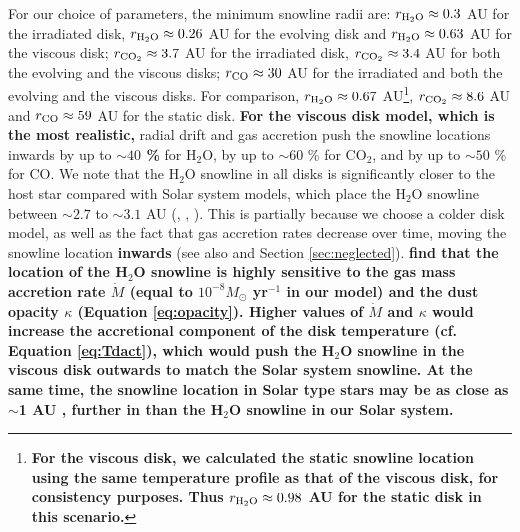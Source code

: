 \documentclass[apj]{emulateapj}
\begin{document}

For our choice of parameters, the minimum snowline radii are: $r_{\rm{H_2O}} \approx 0.3$ AU for the irradiated disk, $r_{\rm{H_2O}} \approx 0.26$ AU for the evolving disk and $r_{\rm{H_2O}} \approx 0.63$ AU for the viscous disk; $r_{\rm{CO_2}} \approx 3.7$ AU for the irradiated disk, $r_{\rm{CO_2}} \approx 3.4$ AU for both the evolving and the viscous disks; $r_{\rm{CO}} \approx 30$ AU for the irradiated and both the evolving and the viscous disks. For comparison, $r_{\rm{H_2O}} \approx 0.67$ AU\footnote{\textbf{For the viscous disk, we calculated the static snowline location using the same temperature profile as that of the viscous disk, for consistency purposes. Thus $r_{\rm{H_2O}} \approx 0.98$ AU for the static disk in this scenario.}}, $r_{\rm{CO_2}} \approx 8.6$ AU and $r_{\rm{CO}} \approx 59$ AU for the static disk. \textbf{For the viscous disk model, which is the most realistic,} radial drift and gas accretion push the snowline locations inwards by up to \textbf{$\sim$$40$ \%} for H$_2$O, by up to  $\sim$$60$ \% for CO$_2$, and by up to $\sim$$50$ \% for CO.  We note that the H$_2$O snowline in all disks is significantly closer to the host star compared with Solar system models, which place the H$_2$O snowline between $\sim$$2.7$ to $\sim$$3.1$ AU (\citealt{hayashi81}, \citealt{podolak04}, \citealt{martin12}). This is partially because we choose a colder disk model, as well as the fact that gas accretion rates decrease over time, moving the snowline location \textbf{inwards} (see also \citealt{garaud07} and Section \ref{sec:neglected}). \textbf{\citet{min11} find that the location of the H$_2$O snowline is highly sensitive to the gas mass accretion rate $\dot{M}$ (equal to $10^{-8} M_{\odot}$ yr$^{-1}$ in our model) and the dust opacity $\kappa$ (Equation \ref{eq:opacity}). Higher values of $\dot{M}$ and $\kappa$ would increase the accretional component of the disk temperature (cf. Equation \ref{eq:Tdact}), which would push the H$_2$O snowline in the viscous disk outwards to match the Solar system snowline. At the same time, the snowline location in Solar type stars may be as close as $\sim$1 AU \citep{mulders15}, further in than the H$_2$O snowline in our Solar system.}
\end{document}
